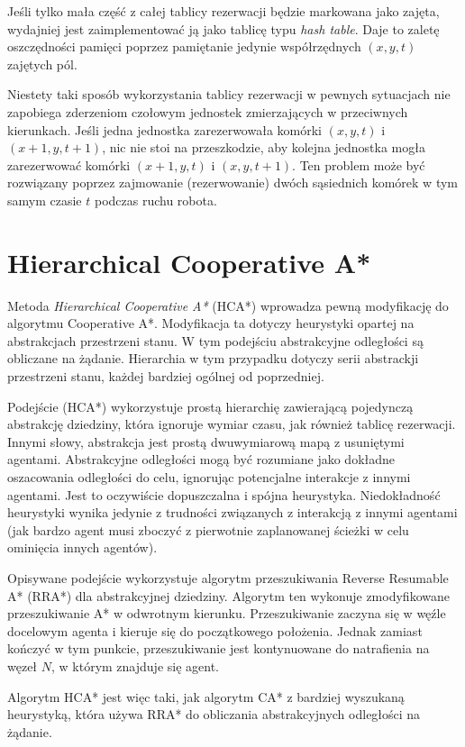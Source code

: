 Jeśli tylko mała część z całej tablicy rezerwacji będzie markowana jako zajęta, wydajniej jest zaimplementować ją jako tablicę typu {\it hash table}. Daje to zaletę oszczędności pamięci poprzez pamiętanie jedynie współrzędnych $(x, y, t)$ zajętych pól.

Niestety taki sposób wykorzystania tablicy rezerwacji w pewnych sytuacjach nie zapobiega zderzeniom czołowym jednostek zmierzających w przeciwnych kierunkach.
Jeśli jedna jednostka zarezerwowała komórki $(x, y, t)$ i $(x + 1, y, t + 1)$, nic nie stoi na przeszkodzie, aby kolejna jednostka mogła zarezerwować komórki $(x + 1, y, t)$ i $(x, y, t + 1)$. Ten problem może być rozwiązany poprzez zajmowanie (rezerwowanie) dwóch sąsiednich komórek w tym samym czasie $t$ podczas ruchu robota.

\section{Hierarchical Cooperative A*}
\label{ch:hier_cooperative_a}
Metoda {\it Hierarchical Cooperative A*} (HCA*) wprowadza pewną modyfikację do algorytmu Cooperative A*. Modyfikacja ta dotyczy heurystyki opartej na abstrakcjach przestrzeni stanu. W tym podejściu abstrakcyjne odległości są obliczane na żądanie. Hierarchia w tym przypadku dotyczy serii abstrackji przestrzeni stanu, każdej bardziej ogólnej od poprzedniej. \cite{cooppath}

Podejście (HCA*) wykorzystuje prostą hierarchię zawierającą pojedynczą abstrakcję dziedziny, która ignoruje wymiar czasu, jak również tablicę rezerwacji.
Innymi słowy, abstrakcja jest prostą dwuwymiarową mapą z usuniętymi agentami. Abstrakcyjne odległości mogą być rozumiane jako dokładne oszacowania odległości do celu, ignorując potencjalne interakcje z innymi agentami. Jest to oczywiście dopuszczalna i spójna heurystyka. Niedokładność heurystyki wynika jedynie z trudności związanych z interakcją z innymi agentami (jak bardzo agent musi zboczyć z pierwotnie zaplanowanej ścieżki w celu ominięcia innych agentów).

Opisywane podejście wykorzystuje algorytm przeszukiwania Reverse Resumable A* (RRA*) dla abstrakcyjnej dziedziny.
Algorytm ten wykonuje zmodyfikowane przeszukiwanie A* w odwrotnym kierunku. Przeszukiwanie zaczyna się w węźle docelowym agenta i kieruje się do początkowego położenia. Jednak zamiast kończyć w tym punkcie, przeszukiwanie jest kontynuowane do natrafienia na węzeł $N$, w którym znajduje się agent.

Algorytm HCA* jest więc taki, jak algorytm CA* z bardziej wyszukaną heurystyką, która używa RRA* do obliczania abstrakcyjnych odległości na żądanie.

